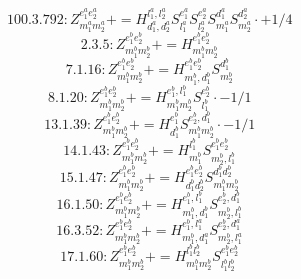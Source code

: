 \documentclass[letterpaper,10pt,fleqn,leqno,onecolumn]{article}
\begin{document}
\begin{equation} \;\;\;\;\;\;  100.3.792: Z^{e_{1}^{a}e_{2}^{a}}_{m_{1}^{a}m_{2}^{a}}+=H^{l_{1}^{a},l_{2}^{a}}_{d_{1}^{a},d_{2}^{a}}S^{e_{1}^{a}}_{l_{1}^{a}}S^{e_{2}^{a}}_{l_{2}^{a}}S^{d_{1}^{a}}_{m_{1}^{a}}S^{d_{2}^{a}}_{m_{2}^{a}}\cdot +1/4 \end{equation}
\begin{equation} \;\;\;\;\;\;  2.3.5: Z^{e_{1}^{b}e_{2}^{b}}_{m_{1}^{b}m_{2}^{b}}+=H^{e_{1}^{b}e_{2}^{b}}_{m_{1}^{b}m_{2}^{b}} \end{equation}
\begin{equation} \;\;\;\;\;\;  7.1.16: Z^{e_{1}^{b}e_{2}^{b}}_{m_{1}^{b}m_{2}^{b}}+=H^{e_{1}^{b}e_{2}^{b}}_{m_{1}^{b},d_{1}^{b}}S^{d_{1}^{b}}_{m_{2}^{b}} \end{equation}
\begin{equation} \;\;\;\;\;\;  8.1.20: Z^{e_{1}^{b}e_{2}^{b}}_{m_{1}^{b}m_{2}^{b}}+=H^{e_{1}^{b},l_{1}^{b}}_{m_{1}^{b}m_{2}^{b}}S^{e_{2}^{b}}_{l_{1}^{b}}\cdot -1/1 \end{equation}
\begin{equation} \;\;\;\;\;\;  13.1.39: Z^{e_{1}^{b}e_{2}^{b}}_{m_{1}^{b}m_{2}^{b}}+=H^{e_{1}^{b}}_{d_{1}^{b}}S^{e_{2}^{b},d_{1}^{b}}_{m_{1}^{b}m_{2}^{b}}\cdot -1/1 \end{equation}
\begin{equation} \;\;\;\;\;\;  14.1.43: Z^{e_{1}^{b}e_{2}^{b}}_{m_{1}^{b}m_{2}^{b}}+=H^{l_{1}^{b}}_{m_{1}^{b}}S^{e_{1}^{b}e_{2}^{b}}_{m_{2}^{b},l_{1}^{b}} \end{equation}
\begin{equation} \;\;\;\;\;\;  15.1.47: Z^{e_{1}^{b}e_{2}^{b}}_{m_{1}^{b}m_{2}^{b}}+=H^{e_{1}^{b}e_{2}^{b}}_{d_{1}^{b}d_{2}^{b}}S^{d_{1}^{b}d_{2}^{b}}_{m_{1}^{b}m_{2}^{b}} \end{equation}
\begin{equation} \;\;\;\;\;\;  16.1.50: Z^{e_{1}^{b}e_{2}^{b}}_{m_{1}^{b}m_{2}^{b}}+=H^{e_{1}^{b},l_{1}^{b}}_{m_{1}^{b},d_{1}^{b}}S^{e_{2}^{b},d_{1}^{b}}_{m_{2}^{b},l_{1}^{b}} \end{equation}
\begin{equation} \;\;\;\;\;\;  16.3.52: Z^{e_{1}^{b}e_{2}^{b}}_{m_{1}^{b}m_{2}^{b}}+=H^{e_{1}^{b},l_{1}^{a}}_{m_{1}^{b},d_{1}^{a}}S^{e_{2}^{b},d_{1}^{a}}_{m_{2}^{b},l_{1}^{a}} \end{equation}
\begin{equation} \;\;\;\;\;\;  17.1.60: Z^{e_{1}^{b}e_{2}^{b}}_{m_{1}^{b}m_{2}^{b}}+=H^{l_{1}^{b}l_{2}^{b}}_{m_{1}^{b}m_{2}^{b}}S^{e_{1}^{b}e_{2}^{b}}_{l_{1}^{b}l_{2}^{b}} \end{equation}
\end{document}
